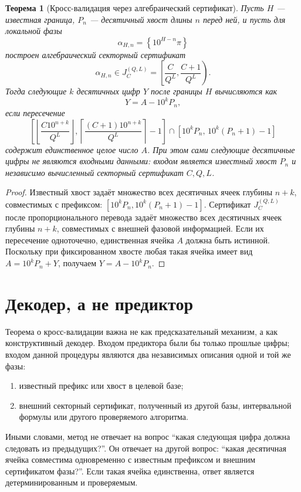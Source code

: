 \documentclass[11pt,a4paper]{article}
\newtheorem{theorem}{Теорема}
\newcommand{\fracpart}[1]{\left\{#1\right\}}
\begin{document}
\begin{theorem}[Кросс-валидация через алгебраический сертификат]
Пусть $H$ --- известная граница, $P_n$ --- десятичный хвост длины $n$ перед ней, и пусть для локальной фазы
\[
  \alpha_{H,n}=\fracpart{10^{H-n}\pi}
\]
построен алгебраический секторный сертификат
\[
  \alpha_{H,n}\in
  J_C^{(Q,L)}=\left[\frac{C}{Q^L},\frac{C+1}{Q^L}\right).
\]
Тогда следующие $k$ десятичных цифр $Y$ после границы $H$ вычисляются как
\[
  Y=A-10^kP_n,
\]
если пересечение
\[
\left[
\left\lfloor\frac{C10^{n+k}}{Q^L}\right\rfloor,
\left\lceil\frac{(C+1)10^{n+k}}{Q^L}\right\rceil-1
\right]
\cap
[10^kP_n,\,10^k(P_n+1)-1]
\]
содержит единственное целое число $A$.  При этом сами следующие десятичные цифры не являются входными данными: входом является известный хвост $P_n$ и независимо вычисленный секторный сертификат $C,Q,L$.
\end{theorem}

\begin{proof}
Известный хвост задаёт множество всех десятичных ячеек глубины $n+k$, совместимых с префиксом: $[10^kP_n,10^k(P_n+1)-1]$.  Сертификат $J_C^{(Q,L)}$ после пропорционального перевода задаёт множество всех десятичных ячеек глубины $n+k$, совместимых с внешней фазовой информацией.  Если их пересечение одноточечно, единственная ячейка $A$ должна быть истинной.  Поскольку при фиксированном хвосте любая такая ячейка имеет вид $A=10^kP_n+Y$, получаем $Y=A-10^kP_n$.
\end{proof}


\section{Декодер, а не предиктор}

Теорема о кросс-валидации важна не как предсказательный механизм, а как конструктивный декодер.  Входом предиктора были бы только прошлые цифры; входом данной процедуры являются два независимых описания одной и той же фазы:
\begin{enumerate}[leftmargin=2em]
  \item известный префикс или хвост в целевой базе;
  \item внешний секторный сертификат, полученный из другой базы, интервальной формулы или другого проверяемого алгоритма.
\end{enumerate}
Иными словами, метод не отвечает на вопрос ``какая следующая цифра должна следовать из предыдущих?''.  Он отвечает на другой вопрос: ``какая десятичная ячейка совместима одновременно с известным префиксом и внешним сертификатом фазы?''.  Если такая ячейка единственна, ответ является детерминированным и проверяемым.
\end{document}
